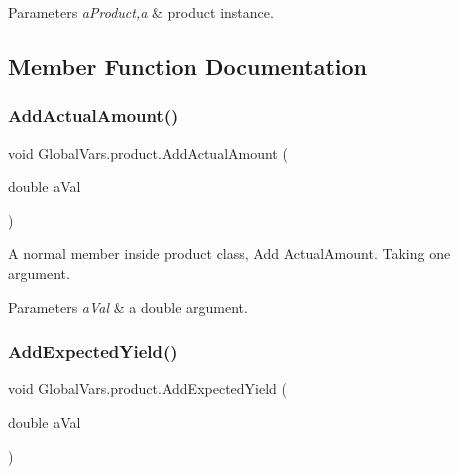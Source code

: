 \begin{DoxyParams}{Parameters}
{\em a\+Product,a} & product instance. \\
\hline
\end{DoxyParams}


\subsection{Member Function Documentation}
\mbox{\label{class_global_vars_1_1product_ad0777eac2225214c7b3abd5f961e41ce}} 
\subsubsection{\texorpdfstring{AddActualAmount()}{AddActualAmount()}}
{\footnotesize\ttfamily void Global\+Vars.\+product.\+Add\+Actual\+Amount (\begin{DoxyParamCaption}\item[{double}]{a\+Val }\end{DoxyParamCaption})\hspace{0.3cm}{\ttfamily [inline]}}



A normal member inside product class, Add Actual\+Amount. Taking one argument. 


\begin{DoxyParams}{Parameters}
{\em a\+Val} & a double argument. \\
\hline
\end{DoxyParams}
\mbox{\label{class_global_vars_1_1product_a8e8487be42a12272849cfcdfd0e87470}} 
\subsubsection{\texorpdfstring{AddExpectedYield()}{AddExpectedYield()}}
{\footnotesize\ttfamily void Global\+Vars.\+product.\+Add\+Expected\+Yield (\begin{DoxyParamCaption}\item[{double}]{a\+Val }\end{DoxyParamCaption})\hspace{0.3cm}{\ttfamily [inline]}}



